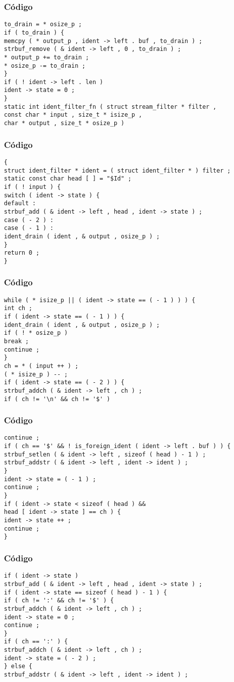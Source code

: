 \documentclass{beamer}
\begin{document}
\begin{frame}[fragile]
\frametitle{C\'odigo}
\begin{verbatim}
to_drain = * osize_p ; 
if ( to_drain ) { 
memcpy ( * output_p , ident -> left . buf , to_drain ) ; 
strbuf_remove ( & ident -> left , 0 , to_drain ) ; 
* output_p += to_drain ; 
* osize_p -= to_drain ; 
} 
if ( ! ident -> left . len ) 
ident -> state = 0 ; 
} 
static int ident_filter_fn ( struct stream_filter * filter , 
const char * input , size_t * isize_p , 
char * output , size_t * osize_p ) 
\end{verbatim}
\end{frame}
\begin{frame}[fragile]
\frametitle{C\'odigo}
\begin{verbatim}
{ 
struct ident_filter * ident = ( struct ident_filter * ) filter ; 
static const char head [ ] = "$Id" ; 
if ( ! input ) { 
switch ( ident -> state ) { 
default : 
strbuf_add ( & ident -> left , head , ident -> state ) ; 
case ( - 2 ) : 
case ( - 1 ) : 
ident_drain ( ident , & output , osize_p ) ; 
} 
return 0 ; 
} 
\end{verbatim}
\end{frame}
\begin{frame}[fragile]
\frametitle{C\'odigo}
\begin{verbatim}
while ( * isize_p || ( ident -> state == ( - 1 ) ) ) { 
int ch ; 
if ( ident -> state == ( - 1 ) ) { 
ident_drain ( ident , & output , osize_p ) ; 
if ( ! * osize_p ) 
break ; 
continue ; 
} 
ch = * ( input ++ ) ; 
( * isize_p ) -- ; 
if ( ident -> state == ( - 2 ) ) { 
strbuf_addch ( & ident -> left , ch ) ; 
if ( ch != '\n' && ch != '$' ) 
\end{verbatim}
\end{frame}
\begin{frame}[fragile]
\frametitle{C\'odigo}
\begin{verbatim}
continue ; 
if ( ch == '$' && ! is_foreign_ident ( ident -> left . buf ) ) { 
strbuf_setlen ( & ident -> left , sizeof ( head ) - 1 ) ; 
strbuf_addstr ( & ident -> left , ident -> ident ) ; 
} 
ident -> state = ( - 1 ) ; 
continue ; 
} 
if ( ident -> state < sizeof ( head ) && 
head [ ident -> state ] == ch ) { 
ident -> state ++ ; 
continue ; 
} 
\end{verbatim}
\end{frame}
\begin{frame}[fragile]
\frametitle{C\'odigo}
\begin{verbatim}
if ( ident -> state ) 
strbuf_add ( & ident -> left , head , ident -> state ) ; 
if ( ident -> state == sizeof ( head ) - 1 ) { 
if ( ch != ':' && ch != '$' ) { 
strbuf_addch ( & ident -> left , ch ) ; 
ident -> state = 0 ; 
continue ; 
} 
if ( ch == ':' ) { 
strbuf_addch ( & ident -> left , ch ) ; 
ident -> state = ( - 2 ) ; 
} else { 
strbuf_addstr ( & ident -> left , ident -> ident ) ; 
\end{verbatim}
\end{frame}
\end{document}
